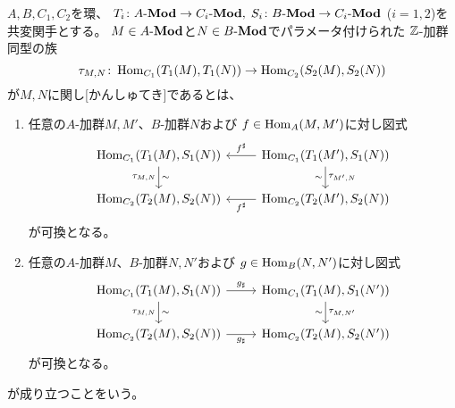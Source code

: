 \documentclass[report]{jlreq}
\begin{document}
\begin{definition}[関手的]
    $A, B, C_1, C_2$を環、
    $T_i \colon A\text{-}\mathbf{Mod} \to C_i\text{-}\mathbf{Mod}, \;
    S_i \colon B\text{-}\mathbf{Mod} \to C_i\text{-}\mathbf{Mod}$
    ($i = 1, 2$)を共変関手とする。
    $M \in A\text{-}\mathbf{Mod}$と$N \in B\text{-}\mathbf{Mod}$でパラメータ付けられた
    $\mathbb{Z}$-加群同型の族
    \begin{equation}
        \tau_{M, N} \colon
            \operatorname{Hom}_{C_1}(T_1(M), T_1(N))
            \to
            \operatorname{Hom}_{C_2}(S_2(M), S_2(N))
    \end{equation}
    が$M, N$に関し[かんしゅてき]であるとは、
    \begin{enumerate}
        \item 任意の$A$-加群$M, M'$、$B$-加群$N$および
            $f \in \operatorname{Hom}_A(M, M')$に対し図式
            \begin{equation}
                \begin{tikzcd}
                    \Hom_{C_1}(T_1(M), S_1(N))
                        \ar{d}[swap]{\tau_{M, N}}{\sim}
                        & \Hom_{C_1}(T_1(M'), S_1(N))
                        \ar{d}{\tau_{M', N}}[swap]{\sim}
                        \ar{l}[swap]{f^\sharp} \\
                    \Hom_{C_2}(T_2(M), S_2(N))
                        & \Hom_{C_2}(T_2(M'), S_2(N))
                        \ar{l}{f^\sharp}
                \end{tikzcd}
            \end{equation}
            が可換となる。
        \item 任意の$A$-加群$M$、$B$-加群$N, N'$および
            $g \in \operatorname{Hom}_B(N, N')$に対し図式
            \begin{equation}
                \begin{tikzcd}
                    \Hom_{C_1}(T_1(M), S_1(N))
                        \ar{d}[swap]{\tau_{M, N}}{\sim}
                        \ar{r}{g_\sharp}
                        & \Hom_{C_1}(T_1(M), S_1(N'))
                        \ar{d}{\tau_{M, N'}}[swap]{\sim} \\
                    \Hom_{C_2}(T_2(M), S_2(N))
                        \ar{r}[swap]{g_\sharp}
                        & \Hom_{C_2}(T_2(M), S_2(N'))
                \end{tikzcd}
            \end{equation}
            が可換となる。
    \end{enumerate}
    が成り立つことをいう。
\end{definition}
\end{document}
